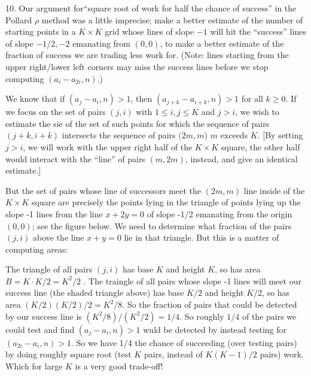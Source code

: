 \bsk

\item{10.} Our argument for``square root of work for half the chance of success''
in the Pollard $\rho$ method was a little imprecise; make a better estimate
of the number of starting points in a $K\times K$ grid whose lines of slope $-1$
will hit the ``success'' lines of slope $-1/2,-2$ emanating from $(0,0)$, to make a better 
estimate of the fraction of success we are trading less work for.
(Note: lines starting from the upper right/lower left corners may miss the
success lines before we stop computing $(a_i-a_{2i},n)$.)

\msk

\item{} We know that if $(a_j-a_i,n)>1$, then $(a_{j+k}-a_{i+k},n)>1$
for all $k\geq 0$. If we focus on the set of pairs $(j,i)$ with $1\leq i,j\leq K$ and 
$j>i$, we wish to 
estimate the sie of the set of such points for which 
the sequence of pairs $(j+k,i+k)$ intersects the
sequence of pairs $(2m,m$)  $m$ exceeds $K$.
[By setting $j>i$, we will work with the upper right half of 
the $K\times K$ square, the other half 
would interact with the ``line'' of pairs $(m,2m)$, instead, and give
an identical estimate.]

\ssk

\item{} But the set of pairs whose line of successors meet the $(2m,m)$ line inside
of the $K\times K$ square are precisely the points lying in the triangle of points lying
up the slope -1 lines from the line $x+2y=0$ of slope -1/2 emanating from the
origin $(0,0)$; see the figure below. We need to determine what fraction of the
pairs $(j,i)$ above the line $x+y=0$ lie in that triangle. But this is 
a matter of computing areas: 

\medskip

\leavevmode

\epsfxsize=2in
\centerline{{}}

\medskip

\item{} The triangle of all pairs $(j,i)$ has base $K$ and height $K$, so has
area $B=K\cdot K/2=K^2/2$ . The traingle of all pairs whose slope -1
lines will meet our success line (the shaded triangle above) has
base $K/2$ and height $K/2$, so has area 
$(K/2)(K/2)/2=K^2/8$. So the fraction of pairs that could be detected
by our success line is $(K^2/8)/(K^2/2)=1/4$.
So roughly $1/4$ of the pairs we could test and find
$(a_j-a_i,n)>1$ wuld be detected by instead testing for 
$(a_{2i}-a_i,n)>1$. So we have 1/4 the chance of succeeding (over
testing  pairs) by doing roughly square root (test
$K$ pairs, instead of $K(K-1)/2$ pairs) work. Which for large $K$
is a very good trade-off!

